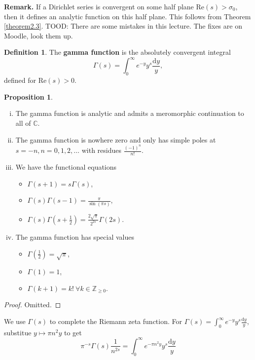 \documentclass{article}
\theoremstyle{definition}
\newtheorem{prop}[theorem]{Proposition}
\newtheorem{defn}[theorem]{Definition}
\begin{document}
\textbf{Remark.} If a Dirichlet series is convergent on some half plane $\text{Re}(s)>\sigma_0$, then it defines an analytic function on this half plane. This follows from Theorem \ref{theorem2.3}. TOOD: There are some mistakes in this lecture. The fixes are on Moodle, look them up.
\begin{defn}\label{defn2.11}
    The \textbf{gamma function} is the absolutely convergent integral \[
    \Gamma(s) = \int_{0}^{\infty} e^{-y}y^s \frac{\mathrm{d}y}{y},
    \]
    defined for $\text{Re}(s)>0$.
\end{defn}
\begin{prop}\label{prop2.12}
    \begin{enumerate}[(i)]
        \item The gamma function is analytic and admits a meromorphic continuation to all of $\mathbb{C}$.
        \item The gamma function is nowhere zero and only has simple poles at $s = -n, n = 0,1,2,\ldots$ with residues $\frac{(-1)^n}{n!}$.
        \item We have the functional equations
        \begin{itemize}
            \item $\Gamma(s+1)=s \Gamma(s)$,
            \item $\Gamma(s) \Gamma(s-1) = \frac{\pi}{\sin(\pi s)}$,
            \item $\Gamma(s) \Gamma\left(s+\frac{1}{2}\right) = \frac{2\sqrt{\pi}}{2^{2s}}\Gamma(2s)$.
        \end{itemize}
        \item The gamma function has special values 
        \begin{itemize}
            \item $\Gamma \left(\frac{1}{2}\right) = \sqrt{\pi}$,
            \item $\Gamma(1)=1$,
            \item $\Gamma(k+1) = k! ~\forall k \in \mathbb{Z}_{\ge 0}$.
        \end{itemize}
    \end{enumerate}
\end{prop}
\begin{proof}
    Omitted.
\end{proof}
We use $\Gamma(s)$ to complete the Riemann zeta function. For $\Gamma(s) = \int_{0}^{\infty} e^{-y}y^s \frac{\mathrm{d}y}{y}$, substitue $y \mapsto \pi n^2y$ to get \[
\pi^{-s}\Gamma(s)\frac{1}{n^{2s}} = \int_{0}^{\infty} e^{-\pi n^2 y} y^s \frac{\mathrm{d}y}{y}
\]
\end{document}
